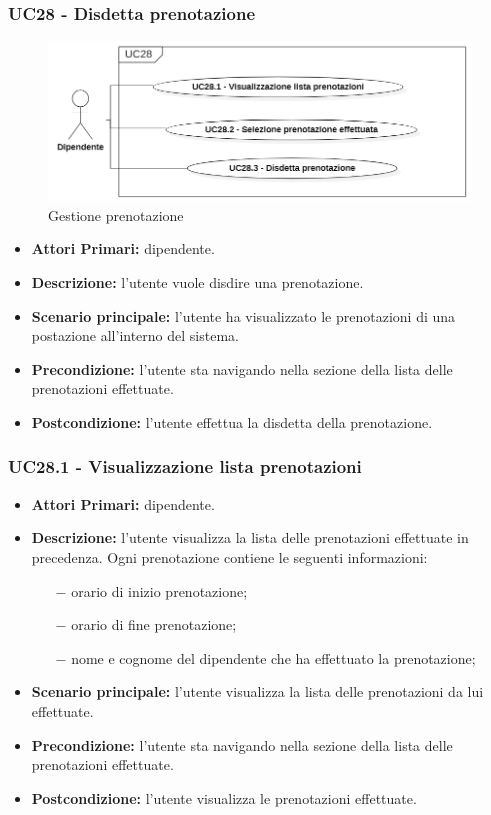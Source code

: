 \subsubsection{ UC28 - Disdetta prenotazione}
\begin{figure}[H]
	\centering
	\includegraphics[width=18cm]{res/images/UC28.png}
	\caption{Gestione prenotazione}
	\label{fig:Gestione prenotazione}
\end{figure}
\begin{itemize}
	\item\textbf{Attori Primari:} dipendente.
	\item\textbf{Descrizione:} l’utente vuole disdire una prenotazione.
	\item\textbf{Scenario principale:} l’utente ha visualizzato le prenotazioni di una postazione all'interno del sistema.
	\item\textbf{Precondizione:} l'utente sta navigando nella sezione della lista delle prenotazioni effettuate.
	\item\textbf{Postcondizione:} l’utente effettua la disdetta della prenotazione.
\end{itemize}
\subsubsection{ UC28.1 - Visualizzazione lista prenotazioni}
\begin{itemize}
	\item\textbf{Attori Primari:} dipendente.
	\item\textbf{Descrizione:} l'utente visualizza la lista delle prenotazioni effettuate in precedenza. Ogni prenotazione contiene le seguenti informazioni:
	\begin{itemize}
		\item[$-$] orario di inizio prenotazione;
		\item[$-$] orario di fine prenotazione;
		\item[$-$] nome e cognome del dipendente che ha effettuato la prenotazione;
	\end{itemize}
	\item\textbf{Scenario principale:} l’utente visualizza la lista delle prenotazioni da lui effettuate.
	\item\textbf{Precondizione:} l'utente sta navigando nella sezione della lista delle prenotazioni effettuate.
	\item\textbf{Postcondizione:} l’utente visualizza le prenotazioni effettuate.
\end{itemize}

